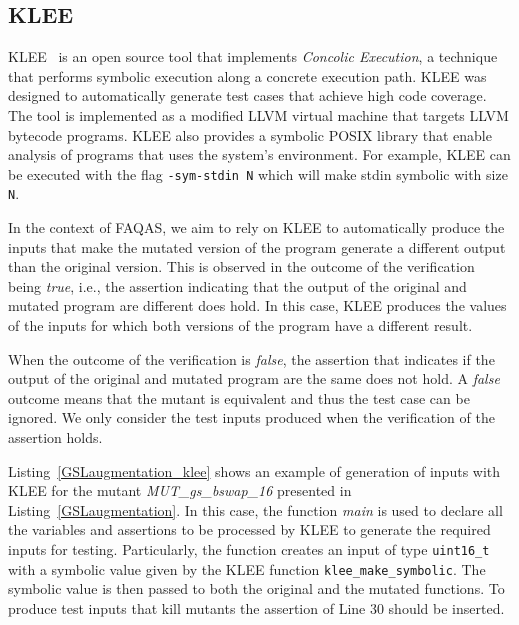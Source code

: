 
\subsection{KLEE}

KLEE~\cite{cadar2008klee} is an open source tool that implements {\em Concolic Execution}, a technique that performs symbolic execution along a concrete execution path. KLEE was designed to automatically generate test cases that achieve high code coverage. The tool is implemented as a modified LLVM virtual machine that targets LLVM bytecode programs.
KLEE also provides a symbolic POSIX library that enable analysis of programs that uses the system's environment. For example, KLEE can be executed with the flag \texttt{-sym-stdin N} which will make stdin symbolic with size \texttt{N}.  

In the context of FAQAS, we aim to rely on KLEE to automatically produce the inputs that make the mutated version of the program generate a different output than the original version.
This is observed in the outcome of the verification being \emph{true}, i.e., the assertion indicating that the output of the original and mutated program are different does hold. In this case, KLEE produces the values of the inputs for which both versions of the program have a different result.

When the outcome of the verification is \emph{false}, the assertion that indicates if the output of the original and mutated program are the same does not hold. A \emph{false} outcome means that the mutant is equivalent and thus the test case can be ignored. 
We only consider the test inputs produced when the verification of the assertion holds.



Listing~\ref{GSLaugmentation_klee} shows an example of generation of inputs with KLEE for the mutant \linebreak\emph{MUT\_gs\_bswap\_16} presented in Listing~\ref{GSLaugmentation}. In this case, the function \emph{main} is used to declare all the variables and assertions to be processed by KLEE to generate the required inputs for testing. Particularly, the function creates an input of type \texttt{uint16\_t} with a symbolic value given by the KLEE function \texttt{klee\_make\_symbolic}. The symbolic value is then passed to both the original and the mutated functions. To produce test inputs that kill mutants the assertion of Line 30 should be inserted.

